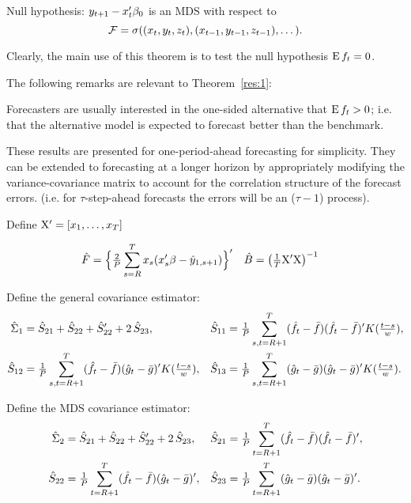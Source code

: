 \documentclass[12pt,fleqn]{article}
\begin{document}
Null hypothesis: $y_{t+1} - x_t'\btrue$ is an MDS with respect to
\begin{equation*}
  \mathcal{F} = \sigma((x_t, y_t, z_t), (x_{t-1}, y_{t-1}, z_{t-1}), \dots).
\end{equation*}

Clearly, the main use of this theorem is to test the null hypothesis
$\operatorname{E} f_t = 0$.

The following remarks are relevant to Theorem~\ref{res:1}:

\begin{rem}
  Forecasters are usually interested in the one-sided alternative that
  $\operatorname{E} f_t > 0$; i.e. that the alternative model is expected
  to forecast better than the benchmark.
\end{rem}

\begin{rem}
  These results are presented for one-period-ahead forecasting for
  simplicity.  They can be extended to forecasting at a longer horizon
  by appropriately modifying the variance-covariance matrix to account
  for the correlation structure of the forecast errors. (i.e. for
  $\tau$-step-ahead forecasts the errors will be an \ma($\tau-1$) process).
\end{rem}

Define $\mathrm{X}' = [x_1,\dots,x_T]$

\begin{align*}
  \hat{F} &= \Big\{\tfrac{2}{P}\sum_{s=R}^T x_s (x_s'\beta - \hat{y}_{1,s+1}) \Big\}' &
  \hat{B} &= \big(\tfrac1T \mathrm{X}'\mathrm{X} \big)^{-1}
\end{align*}

\newcommand{\K}[1]{K(\tfrac{#1}{w})}

Define the general covariance estimator:
\begin{align*}
  \Sigmah_1 &= \Sh_{21} + \Sh_{22} + \Sh_{22}' + 2 \, \Sh_{23}, &
  \Sh_{11} &= \oavg{s,t} (\fh_t - \fb) (\fh_t - \fb)' \K{t-s}, \\
  \Sh_{12} &= \oavg{s,t} (\fh_t - \fb)(\gh_t - \gb)' \K{t-s}, &
  \Sh_{13} &= \oavg{s,t} (\gh_t - \gb)(\gh_t - \gb)'  \K{t-s}.
\end{align*}

Define the MDS covariance estimator:
\begin{align*}
  \hat\Sigma_2 &= \hat{S}_{21} + \hat{S}_{22} + \hat{S}_{22}' + 2 \, \hat{S}_{23}, &
  \hat{S}_{21} &= \tfrac{1}{P} \sum_{t=R+1}^T (\hat{f}_t - \bar{f}) (\hat{f}_t - \bar{f})', \\
  \hat{S}_{22} &= \tfrac{1}{P} \sum_{t=R+1}^T (\hat{f}_t - \bar{f})(\hat{g}_t - \bar{g})', &
  \hat{S}_{23} &= \tfrac{1}{P} \sum_{t=R+1}^T (\hat{g}_t - \bar{g})(\hat{g}_t - \bar{g})'.
\end{align*}
\end{document}
